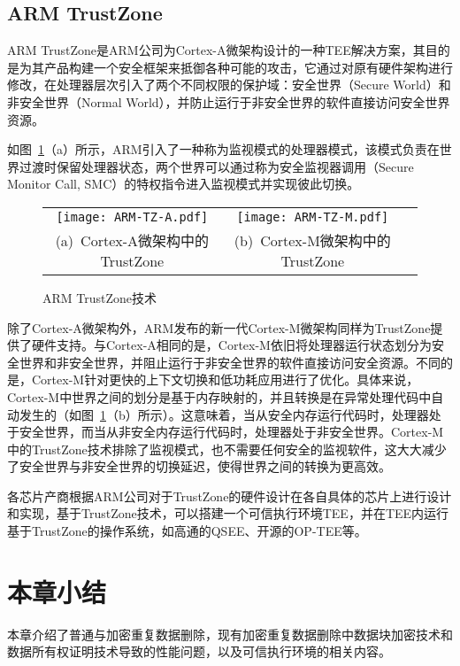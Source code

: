 \subsection{ARM TrustZone}
\label{subsec:background-tee-tz}

ARM TrustZone\cite{trustzone}是ARM公司为Cortex-A微架构\cite{cortex-a}设计的一种TEE解决方案，其目的是为其产品构建一个安全框架来抵御各种可能的攻击，它通过对原有硬件架构进行修改，在处理器层次引入了两个不同权限的保护域：安全世界（Secure World）和非安全世界（Normal World），并防止运行于非安全世界的软件直接访问安全世界资源。

如图~\ref{fig:ARM-TZ-base}（a）所示，ARM引入了一种称为监视模式的处理器模式，该模式负责在世界过渡时保留处理器状态，两个世界可以通过称为安全监视器调用（Secure Monitor Call, SMC）的特权指令进入监视模式并实现彼此切换。

\begin{figure}[!htb]
    \small
    \centering
    \begin{tabular}{@{}c@{}c@{}c}
        \texttt{[image: ARM-TZ-A.pdf]} &
        \hspace{5pt}
        \texttt{[image: ARM-TZ-M.pdf]}\\
        \mbox{\small (a) Cortex-A微架构中的TrustZone} &
        \mbox{\small (b) Cortex-M微架构中的TrustZone}\\
    \end{tabular}
    \caption{ARM TrustZone技术} 
    \label{fig:ARM-TZ-base}
\end{figure}

除了Cortex-A微架构外，ARM发布的新一代Cortex-M微架构\cite{cortex-m}同样为TrustZone提供了硬件支持。与Cortex-A相同的是，Cortex-M依旧将处理器运行状态划分为安全世界和非安全世界，并阻止运行于非安全世界的软件直接访问安全资源。不同的是，Cortex-M针对更快的上下文切换和低功耗应用进行了优化。具体来说，Cortex-M中世界之间的划分是基于内存映射的，并且转换是在异常处理代码中自动发生的（如图~\ref{fig:ARM-TZ-base}（b）所示）。这意味着，当从安全内存运行代码时，处理器处于安全世界，而当从非安全内存运行代码时，处理器处于非安全世界。Cortex-M中的TrustZone技术排除了监视模式，也不需要任何安全的监视软件，这大大减少了安全世界与非安全世界的切换延迟，使得世界之间的转换为更高效。

各芯片产商根据ARM公司对于TrustZone的硬件设计在各自具体的芯片上进行设计和实现，基于TrustZone技术，可以搭建一个可信执行环境TEE，并在TEE内运行基于TrustZone的操作系统，如高通的QSEE、开源的OP-TEE等。

\section{本章小结}

本章介绍了普通与加密重复数据删除，现有加密重复数据删除中数据块加密技术和数据所有权证明技术导致的性能问题，以及可信执行环境的相关内容。
